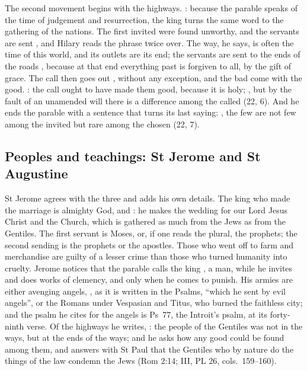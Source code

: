 The second movement begins with the highways. : because the parable speaks of the time of judgement and
resurrection, the king turns the same word to the gathering of the nations.
The first invited were found unworthy, and the servants are sent , and Hilary reads the phrase twice over. The way, he says, is
often the time of this world, and its outlets are its end; the servants are
sent to the ends of the roads , because
at that end everything past is forgiven to all, by the gift of grace. The call
then goes out , without any exception, and the
bad come with the good. : the call ought to have made them good, because it is holy;
, but by
the fault of an unamended will there is a difference among the called
(22, 6). And he ends the parable with a sentence that turns its last saying:
, the few
are not few among the invited but rare among the chosen (22, 7).

\subsection{Peoples and teachings: St Jerome and St Augustine}

St Jerome agrees with the three and adds his own details. The king who made the
marriage is almighty God, and :
he makes the wedding for our Lord Jesus Christ and the Church, which is
gathered as much from the Jews as from the Gentiles. The first servant is
Moses, or, if one reads the plural, the prophets; the second sending is the
prophets or the apostles. Those who went off to farm and merchandise are
guilty of a lesser crime than those who turned humanity into cruelty. Jerome
notices that the parable calls the king , a man, while he invites
and does works of clemency, and only  when he comes to punish. His
armies are either avenging angels, , as it is written in the Psalms, ``which he
sent by evil angels'', or the Romans under Vespasian and Titus, who burned the
faithless city; and the psalm he cites for the angels is Ps~77, the Introit's
psalm, at its forty-ninth verse. Of the highways he writes, : the people of the Gentiles
was not in the ways, but at the ends of the ways; and he asks how any good
could be found among them, and answers with St Paul that the Gentiles who by
nature do the things of the law condemn the Jews (Rom 2:14;  III, PL 26, cols.~159--160).

